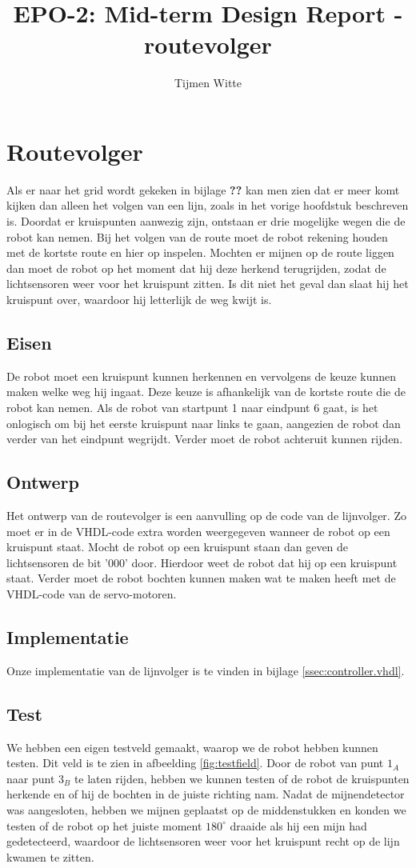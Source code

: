 \documentclass{report}
\title{EPO-2: Mid-term Design Report - routevolger}
\author{Tijmen Witte}
\begin{document}
\chapter{Routevolger}
\label{ch:routevolger}

Als er naar het grid wordt gekeken in bijlage \textbf{??} kan men zien dat er meer komt kijken dan alleen het volgen van een lijn, zoals in het vorige hoofdstuk beschreven is.
Doordat er kruispunten aanwezig zijn, ontstaan er drie mogelijke wegen die de robot kan nemen.
Bij het volgen van de route moet de robot rekening houden met de kortste route en hier op inspelen.
Mochten er mijnen op de route liggen dan moet de robot op het moment dat hij deze herkend terugrijden, zodat de lichtsensoren weer voor het kruispunt zitten.
Is dit niet het geval dan slaat hij het kruispunt over, waardoor hij letterlijk de weg kwijt is.

\section{Eisen}
De robot moet een kruispunt kunnen herkennen en vervolgens de keuze kunnen maken welke weg hij ingaat.
Deze keuze is afhankelijk van de kortste route die de robot kan nemen.
Als de robot van startpunt 1 naar eindpunt 6 gaat, is het onlogisch om bij het eerste kruispunt naar links te gaan, aangezien de robot dan verder van het eindpunt wegrijdt.
Verder moet de robot achteruit kunnen rijden.

\section{Ontwerp}
Het ontwerp van de routevolger is een aanvulling op de code van de lijnvolger.
Zo moet er in de VHDL-code extra worden weergegeven wanneer de robot op een kruispunt staat.
Mocht de robot op een kruispunt staan dan geven de lichtsensoren de bit '000' door. Hierdoor weet de robot dat hij op een kruispunt staat.
Verder moet de robot bochten kunnen maken wat te maken heeft met de VHDL-code van de servo-motoren.

\section{Implementatie}
Onze implementatie van de lijnvolger is te vinden in bijlage \ref{ssec:controller.vhdl}.

\section{Test}
We hebben een eigen testveld gemaakt, waarop we de robot hebben kunnen testen.
Dit veld is te zien in afbeelding \ref{fig:testfield}.
Door de robot van punt $1_A$ naar punt $3_B$ te laten rijden, hebben we kunnen testen of de robot de kruispunten herkende en of hij de bochten in de juiste richting nam.
Nadat de mijnendetector was aangesloten, hebben we mijnen geplaatst op de middenstukken en konden we testen of de robot op het juiste moment $180^\circ$ draaide als hij een mijn had gedetecteerd, waardoor de lichtsensoren weer voor het kruispunt  recht op de lijn kwamen te zitten.
\end{document}
